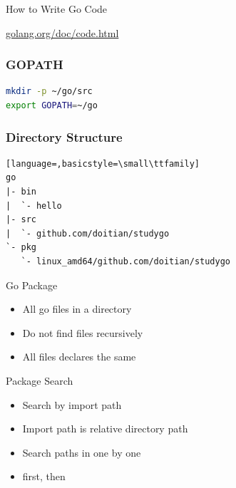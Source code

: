 \documentclass[xetex,mathserif,serif,12pt]{beamer}
\begin{document}
\begin{frame}{How to Write Go Code}

  {\large \href{http://golang.org/doc/code.html}{golang.org/doc/code.html}}

\end{frame}

\begin{frame}[fragile]
  \frametitle{\ttfamily GOPATH}

  \begin{beamer@nomargin}
    \begin{lstlisting}[language=Bash]
mkdir -p ~/go/src
export GOPATH=~/go
    \end{lstlisting}
  \end{beamer@nomargin}
\end{frame}

\begin{frame}[fragile]
  \frametitle{Directory Structure}

  \begin{beamer@nomargin}
    \begin{lstlisting}[language=,basicstyle=\small\ttfamily]
go
|- bin
|  `- hello
|- src
|  `- github.com/doitian/studygo
`- pkg
   `- linux_amd64/github.com/doitian/studygo
    \end{lstlisting}
  \end{beamer@nomargin}
\end{frame}

\begin{frame}{Go Package}
  \begin{itemize}[<+->]
  \item All go files in a directory
  \item Do not find files recursively
  \item All files declares the same 
  \end{itemize}
\end{frame}

\begin{frame}{Package Search}
  \begin{itemize}[<+->]
  \item Search by import path
  \item Import path is relative directory path
  \item Search paths in  one by one
  \item {} first, then 
  \end{itemize}
\end{frame}
\end{document}

